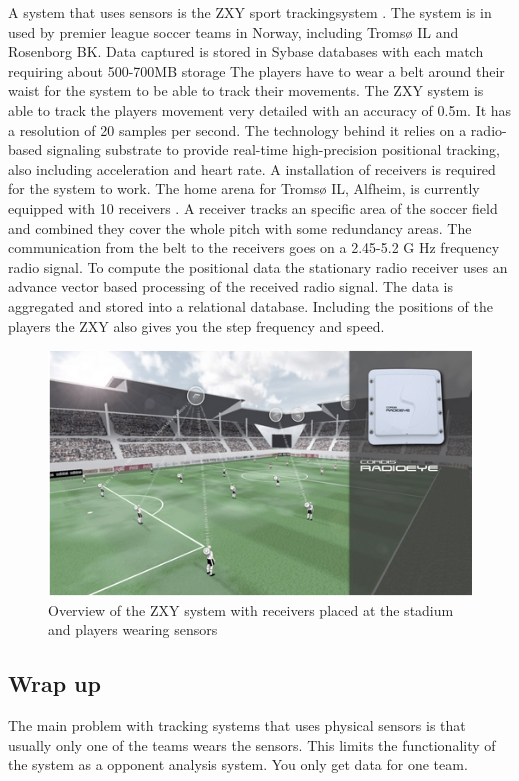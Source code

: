 A system that uses sensors is the ZXY sport trackingsystem \cite{ZXY:mainsite}. The system is in used by premier league soccer teams in Norway, including Tromsø IL and Rosenborg BK. Data captured is stored in Sybase databases with each match requiring about 500-700MB storage  The players have to wear a belt around their waist for the system to be able to track their movements. The ZXY system is able to track the players movement very detailed with an accuracy of 0.5m. It has a resolution of 20 samples per second. The technology behind it relies on a radio-based signaling substrate to provide real-time high-precision positional tracking, also including acceleration and heart rate. A installation of receivers is required for the system to work. The home arena for Tromsø IL, Alfheim, is currently equipped with 10 receivers . A receiver tracks an specific area of the soccer field and combined they cover the whole pitch with some redundancy areas. The communication from the belt to the receivers goes on a 2.45-5.2 G Hz frequency radio signal. To compute the positional data the stationary radio receiver uses an advance vector based processing of the received radio signal. The data is aggregated and stored into a relational database. Including the positions of the players the ZXY also gives you the step frequency and speed. 

\begin{figure}[ht!]
\centering
\includegraphics[width=150mm]{images/general/zxyoverview.png}
\caption{Overview of the ZXY system with receivers placed at the stadium and players wearing sensors}
\label{overflow}
\end{figure}


\subsection{Wrap up}
The main problem with tracking systems that uses physical sensors is that usually only one of the teams wears the sensors.  This limits the functionality of the system as a opponent analysis system. You only get data for one team. 

